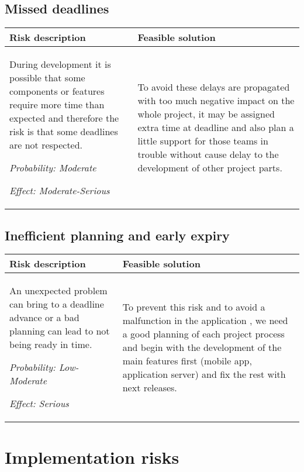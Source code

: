 \documentclass{scrreprt}
\begin{document}
\subsection{Missed deadlines}


\begin{center}
\begin{tabularx}{\columnwidth}{XX}
\toprule \textbf{Risk description} & \textbf{Feasible solution}\\
\midrule
During development it is possible that some components or features require more time than expected and therefore the risk is that some deadlines are not respected.  

\emph{Probability: Moderate } 

\emph{Effect: Moderate-Serious}& To avoid these delays are propagated with too much negative impact on the whole project, it may be assigned extra time at deadline and also plan a little support for those teams in trouble without cause delay to the development of other project parts.\\
\bottomrule
\end{tabularx}
\end{center}

\subsection{Inefficient planning and early expiry}


\begin{center}
\begin{tabularx}{\columnwidth}{XX}
\toprule \textbf{Risk description} & \textbf{Feasible solution}\\
\midrule
 An unexpected problem can bring to a deadline advance or a bad planning can lead to not being ready in time.

\emph{Probability: Low-Moderate } 

\emph{Effect: Serious}&To prevent this risk and to avoid a malfunction in the application , we need a good planning of each project process and begin with the development of the main features first (mobile app, application server) and fix the rest with next releases. \\
\bottomrule
\end{tabularx}
\end{center}

\section{Implementation risks}
\end{document}
